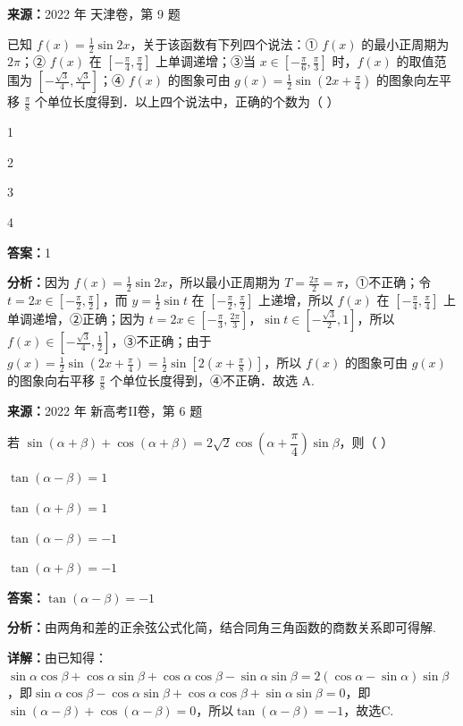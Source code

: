 \begin{question}[points=5]
\textbf{来源：}2022 年 天津卷，第 9 题\par
已知 $f(x)=\frac{1}{2}\sin 2x$，关于该函数有下列四个说法：① $f(x)$ 的最小正周期为 $2\pi$；② $f(x)$ 在 $[-\frac{\pi}{4},\frac{\pi}{4}]$ 上单调递增；③当 $x\in[-\frac{\pi}{6},\frac{\pi}{3}]$ 时，$f(x)$ 的取值范围为 $[-\frac{\sqrt{3}}{4},\frac{\sqrt{3}}{4}]$；④ $f(x)$ 的图象可由 $g(x)=\frac{1}{2}\sin(2x+\frac{\pi}{4})$ 的图象向左平移 $\frac{\pi}{8}$ 个单位长度得到．以上四个说法中，正确的个数为（   ）
\begin{choices}
  \item 1
  \item 2
  \item 3
  \item 4
\end{choices}
\begin{solution}
\textbf{答案：}1

\textbf{分析：}因为 $f(x)=\frac{1}{2}\sin 2x$，所以最小正周期为 $T=\frac{2\pi}{2}=\pi$，①不正确；令 $t=2x\in[-\frac{\pi}{2},\frac{\pi}{2}]$，而 $y=\frac{1}{2}\sin t$ 在 $[-\frac{\pi}{2},\frac{\pi}{2}]$ 上递增，所以 $f(x)$ 在 $[-\frac{\pi}{4},\frac{\pi}{4}]$ 上单调递增，②正确；因为 $t=2x\in[-\frac{\pi}{3},\frac{2\pi}{3}]$，$\sin t\in[-\frac{\sqrt{3}}{2},1]$，所以 $f(x)\in[-\frac{\sqrt{3}}{4},\frac{1}{2}]$，③不正确；由于 $g(x)=\frac{1}{2}\sin(2x+\frac{\pi}{4})=\frac{1}{2}\sin[2(x+\frac{\pi}{8})]$，所以 $f(x)$ 的图象可由 $g(x)$ 的图象向右平移 $\frac{\pi}{8}$ 个单位长度得到，④不正确．故选 A.
\end{solution}
\end{question}

\begin{question}[points=5]
\textbf{来源：}2022 年 新高考II卷，第 6 题\par
若 $\sin(\alpha+\beta)+\cos(\alpha+\beta)=2\sqrt{2}\cos\left(\alpha+\dfrac{\pi}{4}\right)\sin\beta$，则（ ）
\begin{choices}
  \item $\tan(\alpha-\beta)=1$
  \item $\tan(\alpha+\beta)=1$
  \item $\tan(\alpha-\beta)=-1$
  \item $\tan(\alpha+\beta)=-1$
\end{choices}
\begin{solution}
\textbf{答案：}$\tan(\alpha-\beta)=-1$

\textbf{分析：}由两角和差的正余弦公式化简，结合同角三角函数的商数关系即可得解.

\textbf{详解：}由已知得：$\sin\alpha\cos\beta+\cos\alpha\sin\beta+\cos\alpha\cos\beta-\sin\alpha\sin\beta=2(\cos\alpha-\sin\alpha)\sin\beta$，即$\sin\alpha\cos\beta-\cos\alpha\sin\beta+\cos\alpha\cos\beta+\sin\alpha\sin\beta=0$，即$\sin(\alpha-\beta)+\cos(\alpha-\beta)=0$，所以$\tan(\alpha-\beta)=-1$，故选C.
\end{solution}
\end{question}

